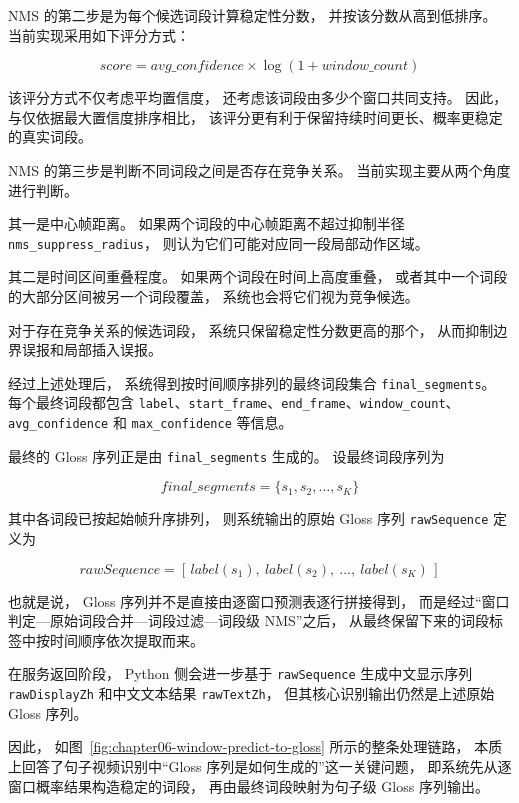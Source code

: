 NMS 的第二步是为每个候选词段计算稳定性分数，
并按该分数从高到低排序。
当前实现采用如下评分方式：

\begin{equation}
score = avg\_confidence \times \log(1 + window\_count)
\label{eq:chapter06-segment-score}
\end{equation}

该评分方式不仅考虑平均置信度，
还考虑该词段由多少个窗口共同支持。
因此，
与仅依据最大置信度排序相比，
该评分更有利于保留持续时间更长、概率更稳定的真实词段。

NMS 的第三步是判断不同词段之间是否存在竞争关系。
当前实现主要从两个角度进行判断。

其一是中心帧距离。
如果两个词段的中心帧距离不超过抑制半径 \texttt{nms\_suppress\_radius}，
则认为它们可能对应同一段局部动作区域。

其二是时间区间重叠程度。
如果两个词段在时间上高度重叠，
或者其中一个词段的大部分区间被另一个词段覆盖，
系统也会将它们视为竞争候选。

对于存在竞争关系的候选词段，
系统只保留稳定性分数更高的那个，
从而抑制边界误报和局部插入误报。

经过上述处理后，
系统得到按时间顺序排列的最终词段集合 \texttt{final\_segments}。
每个最终词段都包含 \texttt{label}、\texttt{start\_frame}、\texttt{end\_frame}、\texttt{window\_count}、\texttt{avg\_confidence} 和 \texttt{max\_confidence} 等信息。

最终的 Gloss 序列正是由 \texttt{final\_segments} 生成的。
设最终词段序列为

\begin{equation}
final\_segments = \{s_1, s_2, \dots, s_K\}
\label{eq:chapter06-final-segments}
\end{equation}

其中各词段已按起始帧升序排列，
则系统输出的原始 Gloss 序列 \texttt{rawSequence} 定义为

\begin{equation}
rawSequence = [\,label(s_1),\ label(s_2),\ \dots,\ label(s_K)\,]
\label{eq:chapter06-raw-sequence}
\end{equation}

也就是说，
Gloss 序列并不是直接由逐窗口预测表逐行拼接得到，
而是经过“窗口判定—原始词段合并—词段过滤—词段级 NMS”之后，
从最终保留下来的词段标签中按时间顺序依次提取而来。

在服务返回阶段，
Python 侧会进一步基于 \texttt{rawSequence} 生成中文显示序列 \texttt{rawDisplayZh} 和中文文本结果 \texttt{rawTextZh}，
但其核心识别输出仍然是上述原始 Gloss 序列。

因此，
如图~\ref{fig:chapter06-window-predict-to-gloss} 所示的整条处理链路，
本质上回答了句子视频识别中“Gloss 序列是如何生成的”这一关键问题，
即系统先从逐窗口概率结果构造稳定的词段，
再由最终词段映射为句子级 Gloss 序列输出。